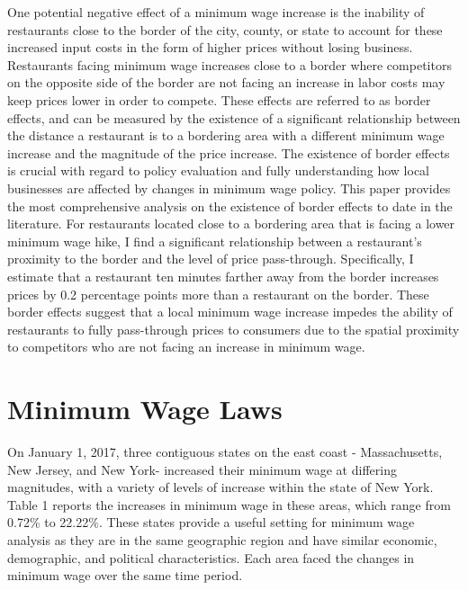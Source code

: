 \documentclass[11pt]{article}
\begin{document}
One potential negative effect of a minimum wage increase is the inability of restaurants close to the border of the city, county, or state to account for these increased input costs in the form of higher prices without losing business. Restaurants facing minimum wage increases close to a border where competitors on the opposite side of the border are not facing an increase in labor costs may keep prices lower in order to compete. These effects are referred to as border effects, and can be measured by the existence of a significant relationship between the distance a restaurant is to a bordering area with a different minimum wage increase and the magnitude of the price increase. The existence of border effects is crucial with regard to policy evaluation and fully understanding how local businesses are affected by changes in minimum wage policy. This paper provides the most comprehensive analysis on the existence of border effects to date in the literature. For restaurants located close to a bordering area that is facing a lower minimum wage hike, I find a significant relationship between a restaurant's proximity to the border and the level of price pass-through. Specifically, I estimate that a restaurant ten minutes farther away from the border increases prices by 0.2 percentage points more than a restaurant on the border. These border effects suggest that a local minimum wage increase impedes the ability of restaurants to fully pass-through prices to consumers due to the spatial proximity to competitors who are not facing an increase in minimum wage. 






\section{Minimum Wage Laws}
On January 1, 2017, three contiguous states on the east coast - Massachusetts, New Jersey, and New York- increased their minimum wage at differing magnitudes, with a variety of levels of increase within the state of New York. Table 1 reports the increases in minimum wage in these areas, which range from 0.72\% to 22.22\%. These states provide a useful setting for minimum wage analysis as they are in the same geographic region and have similar economic, demographic, and political characteristics. Each area faced the changes in minimum wage over the same time period. 
\end{document}
